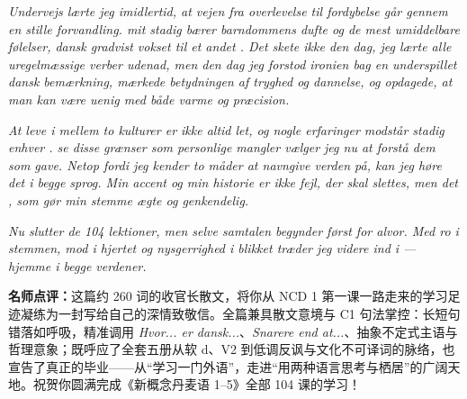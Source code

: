 \begin{answerbox}
\textit{Undervejs lærte jeg imidlertid, at vejen fra overlevelse til fordybelse går gennem en stille forvandling.  mit  stadig bærer barndommens dufte og de mest umiddelbare følelser,  dansk gradvist vokset til et andet . Det skete ikke den dag, jeg lærte alle uregelmæssige verber udenad, men den dag jeg forstod ironien bag en underspillet dansk bemærkning, mærkede betydningen af \textit{tryghed} og \textit{dannelse}, og opdagede, at man kan være uenig med både varme og præcision.}

\textit{At leve i  mellem to kulturer er ikke altid let, og nogle erfaringer modstår stadig enhver .  se disse grænser som personlige mangler vælger jeg nu at forstå dem som  gave. Netop fordi jeg kender to måder at navngive verden på, kan jeg høre det  i begge sprog. Min accent og min historie er ikke fejl, der skal slettes, men det , som gør min stemme ægte og genkendelig.}

\textit{Nu slutter de 104 lektioner, men selve samtalen begynder først for alvor. Med ro i stemmen, mod i hjertet og nysgerrighed i blikket træder jeg videre ind i  --- hjemme i begge verdener.}

\small\textbf{名师点评：}这篇约 260 词的收官长散文，将你从 NCD 1 第一课一路走来的学习足迹凝练为一封写给自己的深情致敬信。全篇兼具散文意境与 C1 句法掌控：长短句错落如呼吸，精准调用 \textit{Hvor... er dansk...}、\textit{Snarere end at...}、抽象不定式主语与哲理意象；既呼应了全套五册从软 d、V2 到低调反讽与文化不可译词的脉络，也宣告了真正的毕业——从“学习一门外语”，走进“用两种语言思考与栖居”的广阔天地。祝贺你圆满完成《新概念丹麦语 1--5》全部 104 课的学习！
\end{answerbox}

